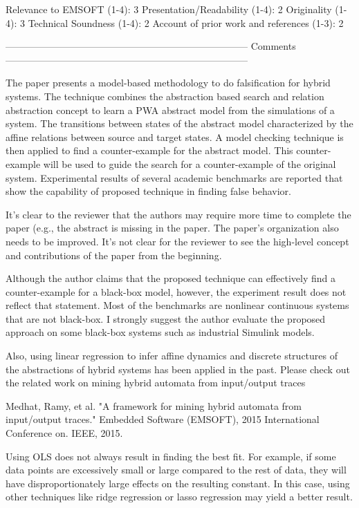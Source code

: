                Relevance to EMSOFT (1-4): 3
          Presentation/Readability (1-4): 2
                       Originality (1-4): 3
               Technical Soundness (1-4): 2
Account of prior work and references (1-3): 2


---------------------------------------------------------------------------
Comments
---------------------------------------------------------------------------

The paper presents a model-based methodology to do falsification for hybrid
systems. The technique combines the abstraction based search and relation
abstraction concept to learn a PWA abstract model from the simulations of a
system. The transitions between states of the abstract model characterized by
the affine relations between source and target states. A model checking
technique is then applied to find a counter-example for the abstract model.
This counter-example will be used to guide the search for a counter-example of
the original system. Experimental results of several academic benchmarks are
reported that show the capability of proposed technique in finding false
behavior.

It's clear to the reviewer that the authors may require more time to complete
the paper (e.g., the abstract is missing in the paper. The paper's organization
also needs to be improved. It's not clear for the reviewer to see the
high-level concept and contributions of the paper from the beginning.

Although the author claims that the proposed technique can effectively find a
counter-example for a black-box model, however, the experiment result does not
reflect that statement. Most of the benchmarks are nonlinear continuous systems
that are not black-box. I strongly suggest the author evaluate the proposed
approach on some black-box systems such as industrial Simulink models.

Also, using linear regression to infer affine dynamics and discrete structures
of the abstractions of hybrid systems has been applied in the past. Please
check out the related work on mining hybrid automata from input/output traces

Medhat, Ramy, et al. "A framework for mining hybrid automata from input/output
traces." Embedded Software (EMSOFT), 2015 International Conference on. IEEE,
2015.

Using OLS does not always result in finding the best fit. For example, if some
data points are excessively small or large compared to the rest of data, they
will have disproportionately large effects on the resulting constant. In this
case, using other techniques like ridge regression or lasso regression may
yield a better result.

